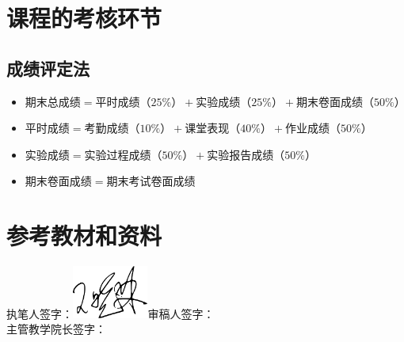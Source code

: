 \documentclass{swfusyllabus}
\begin{document}
\section{课程的考核环节}

\subsection{成绩评定法}

\begin{itemize}
\item \(期末总成绩=平时成绩（25\%）+实验成绩（25\%）+期末卷面成绩（50\%）\)
\item \(平时成绩=考勤成绩（10\%）+课堂表现（40\%）+作业成绩（50\%）\)
\item \(实验成绩 = 实验过程成绩（50\%）+ 实验报告成绩（50\%）\)
\item \(期末卷面成绩 = 期末考试卷面成绩\)
\end{itemize}

\section{参考教材和资料}


\booklist{}

\vfill
\begin{flushright}
  执笔人签字：\includegraphics[width=25mm]{signature}\qquad 审稿人签字：\makebox[2cm][c]{}\\
  主管教学院长签字：\makebox[2cm][c]{}
\end{flushright}
\end{document}
